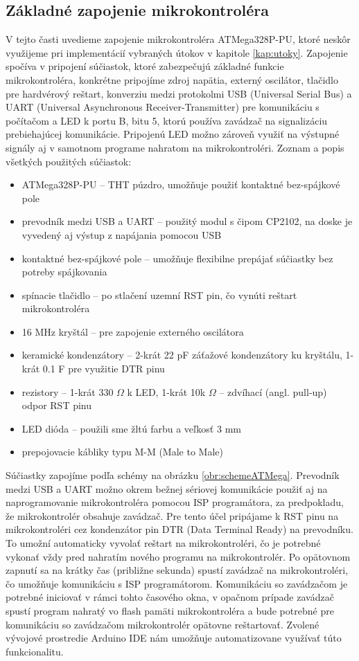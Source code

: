 \subsection{Základné zapojenie mikrokontroléra} \label{kap2:sek:zakladneZapojenie}
V tejto časti uvedieme zapojenie mikrokontroléra ATMega328P-PU, ktoré neskôr využijeme pri implementácií vybraných útokov v kapitole \ref{kap:utoky}. Zapojenie spočíva v pripojení súčiastok, ktoré zabezpečujú základné funkcie mikrokontroléra, konkrétne pripojíme zdroj napätia, externý oscilátor, tlačidlo pre hardvérový reštart, konverziu medzi protokolmi USB (Universal Serial Bus) a UART (Universal Asynchronous Receiver-Transmitter) pre komunikáciu s počítačom a LED k portu B, bitu 5, ktorú používa zavádzač na signalizáciu prebiehajúcej komunikácie. Pripojenú LED možno zároveň využiť na výstupné signály aj v samotnom programe nahratom na mikrokontroléri. Zoznam a popis všetkých použitých súčiastok:
\begin{itemize}
    \item ATMega328P-PU -- THT púzdro, umožňuje použiť kontaktné bez-spájkové pole
    \item prevodník medzi USB a UART -- použitý modul s čipom CP2102, na doske je vyvedený aj výstup z napájania pomocou USB
    \item kontaktné bez-spájkové pole -- umožňuje flexibilne prepájať súčiastky bez potreby spájkovania
    \item spínacie tlačidlo -- po stlačení uzemní RST pin, čo vynúti reštart mikrokontroléra
    \item 16 MHz kryštál -- pre zapojenie externého oscilátora
    \item keramické kondenzátory -- 2-krát 22 pF záťažové kondenzátory ku kryštálu, 1-krát 0.1 \textmu F pre využitie DTR pinu
    \item rezistory -- 1-krát 330 $\Omega$ k LED, 1-krát 10k $\Omega$ -- zdvíhací (angl. pull-up) odpor RST pinu
    \item LED dióda -- použili sme žltú farbu a veľkosť 3 mm
    \item prepojovacie kábliky typu M-M (Male to Male)
\end{itemize}
Súčiastky zapojíme podľa schémy na obrázku \ref{obr:schemeATMega}. Prevodník medzi USB a UART možno okrem bežnej sériovej komunikácie použiť aj na naprogramovanie mikrokontroléra pomocou ISP programátora, za predpokladu, že mikrokontrolér obsahuje zavádzač. Pre tento účel pripájame k RST pinu na mikrokontroléri cez kondenzátor pin DTR (Data Terminal Ready) na prevodníku. To umožní automaticky vyvolať reštart na mikrokontroléri, čo je potrebné vykonať vždy pred nahratím nového programu na mikrokontrolér. Po opätovnom zapnutí sa na krátky čas (približne sekunda) spustí zavádzač na mikrokontroléri, čo umožňuje komunikáciu s ISP programátorom. Komunikáciu so zavádzačom je potrebné iniciovať v rámci tohto časového okna, v opačnom prípade zavádzač spustí program nahratý vo flash pamäti mikrokontroléra a bude potrebné pre komunikáciu so zavádzačom mikrokontrolér opätovne reštartovať. Zvolené vývojové prostredie Arduino IDE nám umožňuje automatizovane využívať túto funkcionalitu.

